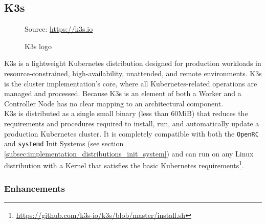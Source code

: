 \subsection{K3s}
\label{subsec:implementation_dependencies_k3s}

\begin{figure} %
  \centering
  \def\stackalignment{l} %
  {\scriptsize \parbox[t]{\linewidth}{ Source: \url{https://k3s.io}} }
  \caption{K3s logo}
\end{figure}

K3s is a lightweight Kubernetes distribution designed for production workloads
in resource-constrained, high-availability, unattended, and remote environments\cite{k3s}.
K3s is the cluster implementation's core, where all Kubernetes-related
operations are managed and processed. Because K3s is an element of both a Worker
and a Controller Node has no clear mapping to an architectural component. \\ %
K3s is distributed as a single small binary (less than 60MiB) that reduces the requirements
and procedures required to install, run, and automatically update a production Kubernetes
cluster\cite{k3s}. It is completely compatible with both the \texttt{OpenRC} and
\texttt{systemd} Init Systems (see section
\ref{subsec:implementation_distributions_init_system}) and can run on any Linux distribution
with a Kernel that satisfies the basic Kubernetes requirements\footnote{\url{https://github.com/k3s-io/k3s/blob/master/install.sh}}.

\subsubsection{Enhancements}
\label{subsubsec:implementation_dependencies_k3s_enhancements}

